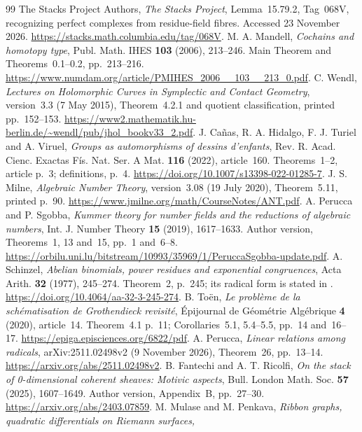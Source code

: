 \documentclass[11pt,a4paper]{article}
\theoremstyle{definition}
\begin{document}
\begin{thebibliography}{99}
 The Stacks Project Authors, \emph{The Stacks Project}, Lemma~15.79.2, Tag~068V, recognizing perfect complexes from residue-field fibres. Accessed 23 November 2026. \url{https://stacks.math.columbia.edu/tag/068V}.
 M. A. Mandell, \emph{Cochains and homotopy type}, Publ. Math. IHES \textbf{103} (2006), 213--246. Main Theorem and Theorems~0.1--0.2, pp.~213--216. \url{https://www.numdam.org/article/PMIHES_2006__103__213_0.pdf}.
 C. Wendl, \emph{Lectures on Holomorphic Curves in Symplectic and Contact Geometry}, version~3.3 (7 May 2015), Theorem~4.2.1 and quotient classification, printed pp.~152--153. \url{https://www2.mathematik.hu-berlin.de/~wendl/pub/jhol_bookv33_2.pdf}.
 J. Cañas, R. A. Hidalgo, F. J. Turiel and A. Viruel, \emph{Groups as automorphisms of dessins d'enfants}, Rev. R. Acad. Cienc. Exactas Fís. Nat. Ser. A Mat. \textbf{116} (2022), article~160. Theorems~1--2, article p.~3; definitions, p.~4. \url{https://doi.org/10.1007/s13398-022-01285-7}.
 J. S. Milne, \emph{Algebraic Number Theory}, version~3.08 (19 July 2020), Theorem~5.11, printed p.~90. \url{https://www.jmilne.org/math/CourseNotes/ANT.pdf}.
 A. Perucca and P. Sgobba, \emph{Kummer theory for number fields and the reductions of algebraic numbers}, Int. J. Number Theory \textbf{15} (2019), 1617--1633. Author version, Theorems~1, 13 and~15, pp.~1 and~6--8. \url{https://orbilu.uni.lu/bitstream/10993/35969/1/PeruccaSgobba-update.pdf}.
 A. Schinzel, \emph{Abelian binomials, power residues and exponential congruences}, Acta Arith. \textbf{32} (1977), 245--274. Theorem~2, p.~245; its radical form is stated in \cite[Theorem~15, p.~7]{PeruccaSgobba}. \url{https://doi.org/10.4064/aa-32-3-245-274}.
 B. To\"en, \emph{Le probl\`eme de la sch\'ematisation de Grothendieck revisit\'e}, Épijournal de Géométrie Algébrique \textbf{4} (2020), article~14. Theorem~4.1 p.~11; Corollaries~5.1, 5.4--5.5, pp.~14 and~16--17. \url{https://epiga.episciences.org/6822/pdf}.
 A. Perucca, \emph{Linear relations among radicals}, arXiv:2511.02498v2 (9 November 2026), Theorem~26, pp.~13--14. \url{https://arxiv.org/abs/2511.02498v2}.
 B. Fantechi and A. T. Ricolfi, \emph{On the stack of 0-dimensional coherent sheaves: Motivic aspects}, Bull. London Math. Soc. \textbf{57} (2025), 1607--1649. Author version, Appendix~B, pp.~27--30. \url{https://arxiv.org/abs/2403.07859}.
 M. Mulase and M. Penkava,
\emph{Ribbon graphs, quadratic differentials on Riemann surfaces,
}
\end{thebibliography}
\end{document}
